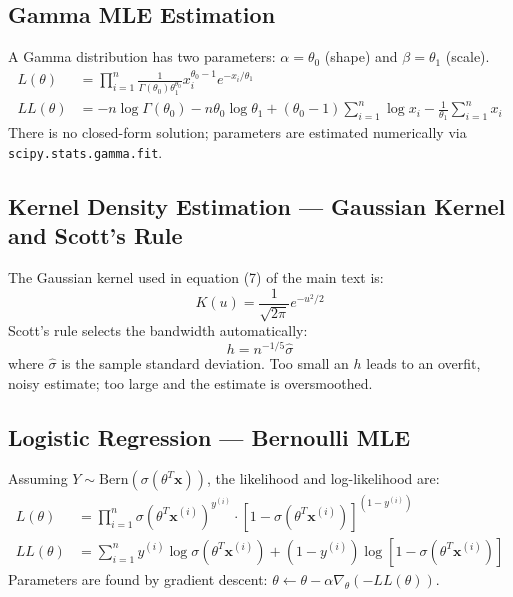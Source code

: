 \documentclass{article}
\begin{document}
\subsection*{Gamma MLE Estimation}
A Gamma distribution has two parameters: $\alpha = \theta_0$ (shape) and $\beta = \theta_1$ (scale).
\begin{equation}
\begin{aligned}
L(\theta) &= \prod_{i=1}^n \frac{1}{\Gamma(\theta_0)\theta_1^{\theta_0}} x_i^{\theta_0-1} e^{-x_i/\theta_1} \\
LL(\theta) &= -n\log\Gamma(\theta_0) - n\theta_0\log\theta_1 + (\theta_0-1)\sum_{i=1}^n\log x_i - \frac{1}{\theta_1}\sum_{i=1}^n x_i
\end{aligned}
\end{equation}
There is no closed-form solution; parameters are estimated numerically via \verb|scipy.stats.gamma.fit|.

\subsection*{Kernel Density Estimation --- Gaussian Kernel and Scott's Rule}
The Gaussian kernel used in equation (7) of the main text is:
\begin{equation}
K(u) = \frac{1}{\sqrt{2\pi}} e^{-u^2/2}
\end{equation}
Scott's rule selects the bandwidth automatically:
\begin{equation}
h = n^{-1/5} \hat{\sigma}
\end{equation}
where $\hat{\sigma}$ is the sample standard deviation. Too small an $h$ leads to an overfit, noisy estimate; too large and the estimate is oversmoothed.

\subsection*{Logistic Regression --- Bernoulli MLE}
Assuming $Y \sim \text{Bern}(\sigma(\theta^T \mathbf{x}))$, the likelihood and log-likelihood are:
\begin{equation}
\begin{aligned}
L(\theta) &= \prod_{i=1}^n \sigma(\theta^T \mathbf{x}^{(i)})^{y^{(i)}} \cdot \left[1 - \sigma(\theta^T \mathbf{x}^{(i)})\right]^{(1-y^{(i)})} \\
LL(\theta) &= \sum_{i=1}^n y^{(i)} \log \sigma(\theta^T \mathbf{x}^{(i)}) + (1 - y^{(i)}) \log\left[1 - \sigma(\theta^T \mathbf{x}^{(i)})\right]
\end{aligned}
\end{equation}
Parameters are found by gradient descent: $\theta \leftarrow \theta - \alpha \nabla_\theta (-LL(\theta))$.
\end{document}
